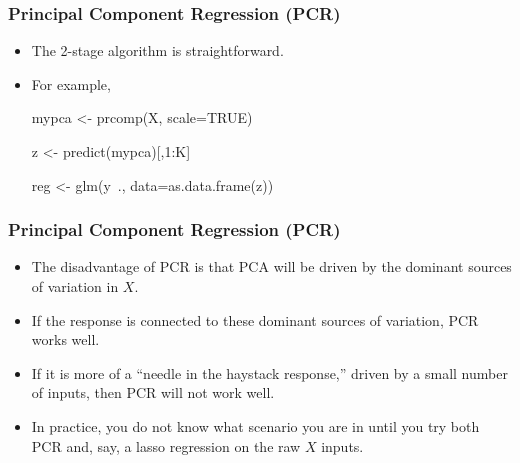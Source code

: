 \documentclass[
  shownotes,
  xcolor={svgnames},
  hyperref={colorlinks,citecolor=DarkBlue,linkcolor=DarkRed,urlcolor=DarkBlue}
  , aspectratio=169]{beamer}
\newcommand{\nv}{\color{Navy}}
\begin{document}
\begin{frame}[fragile]
\frametitle{ Principal Component Regression (PCR)}


\begin{itemize}
 \item The 2-stage algorithm is straightforward. 
 \medskip
 \item For example,
\medskip
{\nv 
\begin{semiverbatim}\vspace{.25cm}\small
         mypca <- prcomp(X, scale=TRUE)

         z <- predict(mypca)[,1:K]

         reg <- glm(y~., data=as.data.frame(z))
\end{semiverbatim}
}

\end{itemize}

\end{frame}
\begin{frame}[fragile]
\frametitle{ Principal Component Regression (PCR)}


\begin{itemize}

  \item The disadvantage of PCR is that PCA will be driven by the dominant sources of variation in $X$. 
  \medskip
  \item If the response is connected to these dominant sources of variation, PCR works well.
  \medskip
  \item  If it is more of a “needle in the haystack response,” driven by a small number of inputs, then PCR will not work well. 
  \medskip
  \item In practice, you do not know what scenario you are in until you try both PCR and, say, a lasso regression on the raw $X$ inputs.

\end{itemize}


\end{frame}
\end{document}
